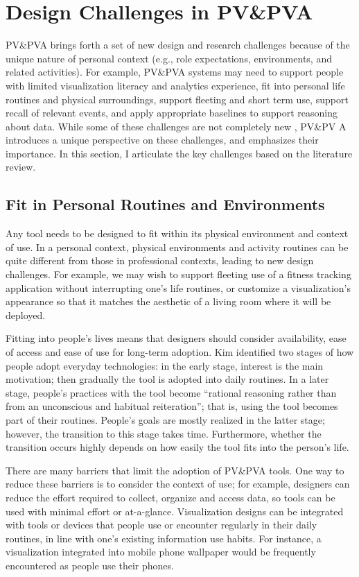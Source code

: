 \documentclass[12pt,oneside]{book}
\begin{document}
\section{Design Challenges in PV\&PVA}
\label{pva:challenges}
PV\&PVA brings forth a set of new design and research challenges because of the unique nature of personal context (e.g., role expectations, environments, and related activities). For example, PV\&PVA systems may need to support people with limited visualization literacy and analytics experience, fit into personal life routines and physical surroundings, support fleeting and short term use, support recall of relevant events, and apply appropriate baselines to support reasoning about data. While some of these challenges are not completely new , PV\&PV A introduces a unique perspective on these challenges, and emphasizes their importance.  In this section, I articulate the key challenges based on the literature review.

\subsection{Fit in Personal Routines and Environments}
Any tool needs to be designed to fit within its physical environment and context of use. In a personal context, physical environments and activity routines can be quite different from those in professional contexts, leading to new design challenges. For example, we may wish to support fleeting use of a fitness tracking application without interrupting one's life routines, or customize a visualization's appearance so that it matches the aesthetic of a living room where it will be deployed.

Fitting into people's lives means that designers should consider availability, ease of access and ease of use for long-term adoption.  Kim\cite{kim_inair:_2013} identified two stages of how people adopt everyday technologies: in the early stage, interest is the main motivation; then gradually the tool is adopted into daily routines. In a later stage, people's practices with the tool become ``rational reasoning rather than from an unconscious and habitual reiteration''; that is, using the tool becomes part of their routines. People's goals are mostly realized in the latter stage; however, the transition to this stage takes time.  Furthermore, whether the transition occurs highly depends on how easily the tool fits into the person's life.

There are many barriers that limit the adoption of PV\&PVA tools.  One way to reduce these barriers is to consider the context of use; for example, designers can reduce the effort required to collect, organize and access data, so tools can be used with minimal effort or at-a-glance. Visualization designs can be integrated with tools or devices that people use or encounter regularly in their daily routines, in line with one's existing information use habits. For instance, a visualization integrated into mobile phone wallpaper would be frequently encountered as people use their phones.
\end{document}

